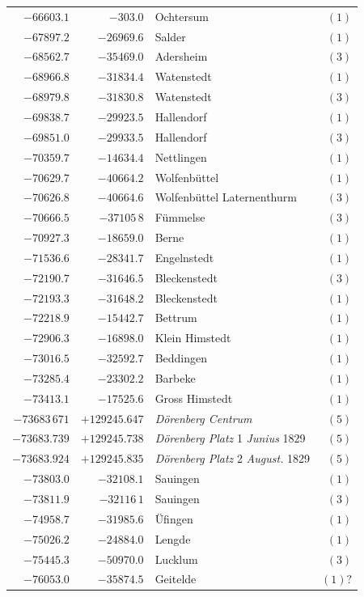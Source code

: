 \begin{center}
\begin{tabular}{r|r|p{170pt}|r}
\(-66603.1\)&\(-303.0\)&Ochtersum&\((1)\)\\
\(-67897.2\)&\(-26969.6\)&Salder&\((1)\)\\
\(-68562.7\)&\(-35469.0\)&Adersheim&\((3)\)\\
\(-68966.8\)&\(-31834.4\)&Watenstedt&\((1)\)\\
\(-68979.8\)&\(-31830.8\)&Watenstedt&\((3)\)\\
\(-69838.7\)&\(-29923.5\)&Hallendorf&\((1)\)\\
\(-69851.0\)&\(-29933.5\)&Hallendorf&\((3)\)\\
\(-70359.7\)&\(-14634.4\)&Nettlingen&\((1)\)\\
\(-70629.7\)&\(-40664.2\)&Wolfenbüttel&\((1)\)\\
\(-70626.8\)&\(-40664.6\)&Wolfenbüttel Laternenthurm&\((3)\)\\
\(-70666.5\)&\(-37105\,8\)&Fümmelse&\((3)\)\\
\(-70927.3\)&\(-18659.0\)&Berne&\((1)\)\\
\(-71536.6\)&\(-28341.7\)&Engelnstedt&\((1)\)\\
\(-72190.7\)&\(-31646.5\)&Bleckenstedt&\((3)\)\\
\(-72193.3\)&\(-31648.2\)&Bleckenstedt&\((1)\)\\
\(-72218.9\)&\(-15442.7\)&Bettrum&\((1)\)\\
\(-72906.3\)&\(-16898.0\)&Klein Himstedt&\((1)\)\\
\(-73016.5\)&\(-32592.7\)&Beddingen&\((1)\)\\
\(-73285.4\)&\(-23302.2\)&Barbeke&\((1)\)\\
\(-73413.1\)&\(-17525.6\)&Gross Himstedt&\((1)\)\\
\(-73683\,671\)&\(+129245.647\)&\textit{Dörenberg Centrum}&\((5)\)\\
\(-73683.739\)&\(+129245.738\)&\textit{Dörenberg Platz} 1 \textit{Junius} 1829&\((5)\)\\
\(-73683.924\)&\(+129245.835\)&\textit{Dörenberg Platz} 2 \textit{August.} 1829&\((5)\)\\
\(-73803.0\)&\(-32108.1\)&Sauingen&\((1)\)\\
\(-73811.9\)&\(-32116\,1\)&Sauingen&\((3)\)\\
\(-74958.7\)&\(-31985.6\)&Üfingen&\((1)\)\\
\(-75026.2\)&\(-24884.0\)&Lengde&\((1)\)\\
\(-75445.3\)&\(-50970.0\)&Lucklum&\((3)\)\\
\(-76053.0\)&\(-35874.5\)&Geitelde&\((1)?\)\\
\hline\end{tabular}\endgroup\end{center}

